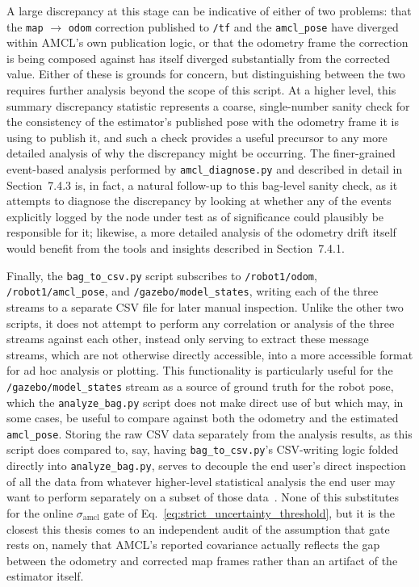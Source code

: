 A large discrepancy at this stage can be indicative of either of two problems: that the \texttt{map} $\rightarrow$ \texttt{odom} correction published to \texttt{/tf} and the \texttt{amcl\_pose} have diverged within AMCL's own publication logic, or that the odometry frame the correction is being composed against has itself diverged substantially from the corrected value. Either of these is grounds for concern, but distinguishing between the two requires further analysis beyond the scope of this script. At a higher level, this summary discrepancy statistic represents a coarse, single-number sanity check for the consistency of the estimator's published pose with the odometry frame it is using to publish it, and such a check provides a useful precursor to any more detailed analysis of why the discrepancy might be occurring. The finer-grained event-based analysis performed by \texttt{amcl\_diagnose.py} and described in detail in Section~7.4.3 is, in fact, a natural follow-up to this bag-level sanity check, as it attempts to diagnose the discrepancy by looking at whether any of the events explicitly logged by the node under test as of significance could plausibly be responsible for it; likewise, a more detailed analysis of the odometry drift itself would benefit from the tools and insights described in Section~7.4.1.

Finally, the \texttt{bag\_to\_csv.py} script subscribes to \texttt{/robot1/odom}, \texttt{/robot1/amcl\_pose}, and \texttt{/gazebo/\-model\_states}, writing each of the three streams to a separate CSV file for later manual inspection. Unlike the other two scripts, it does not attempt to perform any correlation or analysis of the three streams against each other, instead only serving to extract these message streams, which are not otherwise directly accessible, into a more accessible format for ad hoc analysis or plotting. This functionality is particularly useful for the \texttt{/gazebo/model\_states} stream as a source of ground truth for the robot pose, which the \texttt{analyze\_bag.py} script does not make direct use of but which may, in some cases, be useful to compare against both the odometry and the estimated \texttt{amcl\_pose}. Storing the raw CSV data separately from the analysis results, as this script does compared to, say, having \texttt{bag\_to\_csv.py}'s CSV-writing logic folded directly into \texttt{analyze\_bag.py}, serves to decouple the end user's direct inspection of all the data from whatever higher-level statistical analysis the end user may want to perform separately on a subset of those data~\cite{kudriashov2026real}. None of this substitutes for the online $\sigma_{\text{amcl}}$ gate of Eq.~\eqref{eq:strict_uncertainty_threshold}, but it is the closest this thesis comes to an independent audit of the assumption that gate rests on, namely that AMCL's reported covariance actually reflects the gap between the odometry and corrected map frames rather than an artifact of the estimator itself.

